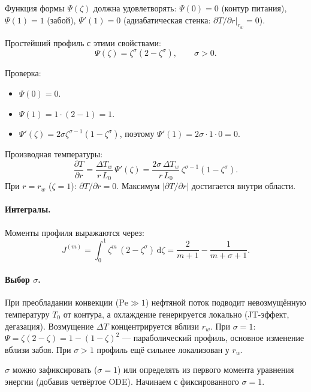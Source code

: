 \documentclass[12pt,a4paper]{article}
\newcommand{\dd}{\mathrm{d}}
\newcommand{\pp}{\partial}
\begin{document}
Функция формы $\Psi(\zeta)$ должна удовлетворять:
$\Psi(0) = 0$ (контур питания),
$\Psi(1) = 1$ (забой),
$\Psi'(1) = 0$ (адиабатическая стенка: $\pp T/\pp r|_{r_w} = 0$).

Простейший профиль с этими свойствами:
\begin{equation}\label{eq:Psi}
  \boxed{
    \Psi(\zeta) = \zeta^\sigma(2 - \zeta^\sigma),
    \qquad \sigma > 0.
  }
\end{equation}

Проверка:
\begin{itemize}[nosep]
  \item $\Psi(0) = 0$. \checkmark
  \item $\Psi(1) = 1\cdot(2-1) = 1$. \checkmark
  \item $\Psi'(\zeta) = 2\sigma\zeta^{\sigma-1}(1 - \zeta^\sigma)$,
        поэтому $\Psi'(1) = 2\sigma\cdot 1\cdot 0 = 0$. \checkmark
\end{itemize}

Производная температуры:
\begin{equation}\label{eq:dT_dr}
  \frac{\pp T}{\pp r}
  = \frac{\Delta T_w}{r\,L_0}\,\Psi'(\zeta)
  = \frac{2\sigma\,\Delta T_w}{r\,L_0}\,
    \zeta^{\sigma-1}(1-\zeta^\sigma).
\end{equation}
При $r = r_w$ ($\zeta = 1$): $\pp T/\pp r = 0$. \checkmark
Максимум $|\pp T/\pp r|$ достигается внутри области.

\paragraph{Интегралы.}
Моменты профиля выражаются через:
\begin{equation}\label{eq:IPsi}
  J^{(m)} = \int_0^1 \zeta^m\,(2 - \zeta^\sigma)\,\dd\zeta
  = \frac{2}{m+1} - \frac{1}{m+\sigma+1}.
\end{equation}

\paragraph{Выбор $\sigma$.}
При преобладании конвекции ($\mathrm{Pe} \gg 1$)
нефтяной поток подводит невозмущённую
температуру $T_0$ от контура, а охлаждение
генерируется локально (JT-эффект, дегазация).
Возмущение $\Delta T$ концентрируется
вблизи $r_w$. При $\sigma = 1$: $\Psi = \zeta(2-\zeta) = 1-(1-\zeta)^2$ ---
параболический профиль, основное изменение
вблизи забоя. При $\sigma > 1$ профиль
ещё сильнее локализован у $r_w$.

$\sigma$ можно зафиксировать ($\sigma = 1$) или определять
из первого момента уравнения энергии (добавив четвёртое ODE).
Начинаем с фиксированного $\sigma = 1$.
\end{document}
